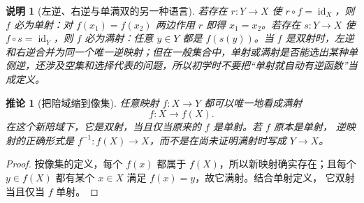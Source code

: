 \documentclass[UTF8,fontset=none,a4paper,11pt]{ctexart}
\theoremstyle{foundation-definition}
\theoremstyle{foundation-theorem}
\theoremstyle{foundation-proposition}
\theoremstyle{foundation-example}
\theoremstyle{foundation-remark}
\newtheorem{remark}[definition]{说明}
\theoremstyle{foundation-theorem}
\newtheorem{corollary}[definition]{推论}
\begin{document}
\begin{remark}[左逆、右逆与单满双的另一种语言]
若存在 \(r:Y\to X\) 使 \(r\circ f=\operatorname{id}_X\)，则 \(f\) 必为单射：对
\(f(x_1)=f(x_2)\) 两边作用 \(r\) 即得 \(x_1=x_2\)。若存在
\(s:Y\to X\) 使 \(f\circ s=\operatorname{id}_Y\)，则 \(f\) 必为满射：任意
\(y\in Y\) 都是 \(f(s(y))\)。当 \(f\) 是双射时，左逆和右逆合并为同一个唯一逆映射；但在一般集合中，单射或满射是否能选出某种单侧逆，还涉及空集和选择代表的问题，所以初学时不要把“单射就自动有逆函数”当成定义。
\end{remark}

\begin{corollary}[把陪域缩到像集]\label{cor:restriction-to-image}
任意映射 \(f:X\to Y\) 都可以唯一地看成满射
\[
f:X\longrightarrow f(X).
\]
在这个新陪域下，它是双射，当且仅当原来的 \(f\) 是单射。若 \(f\) 原本是单射，
逆映射的正确形式是 \(f^{-1}:f(X)\to X\)，而不是在尚未证明满射时写成 \(Y\to X\)。
\end{corollary}

\begin{proof}
按像集的定义，每个 \(f(x)\) 都属于 \(f(X)\)，所以新映射确实存在；且每个
\(y\in f(X)\) 都有某个 \(x\in X\) 满足 \(f(x)=y\)，故它满射。结合单射定义，
它双射当且仅当 \(f\) 单射。
\end{proof}
\end{document}
